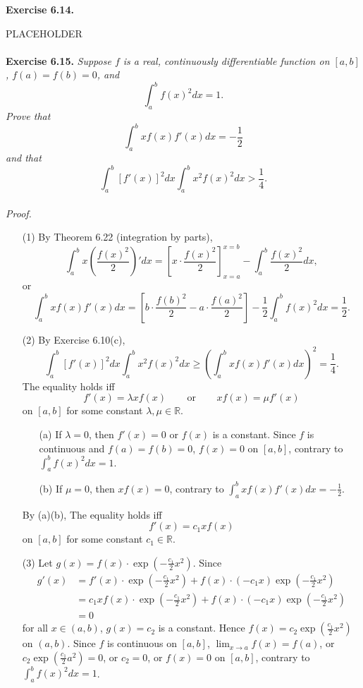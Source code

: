 \documentclass{article}
\begin{document}
\textbf{Exercise 6.14.}

PLACEHOLDER \\\\






\textbf{Exercise 6.15.}
\emph{Suppose $f$ is a real, continuously differentiable function on $[a,b]$,
$f(a)=f(b)=0$, and
\[
  \int_{a}^{b} f(x)^2 dx = 1.
\]
Prove that
\[
  \int_{a}^{b} xf(x)f'(x) dx = -\frac{1}{2}
\]
and that
\[
  \int_{a}^{b} [f'(x)]^2 dx \int_{a}^{b} x^2f(x)^2 dx > \frac{1}{4}.
\]
} \\

\emph{Proof.}
\begin{enumerate}
  \item[(1)]
  By Theorem 6.22 (integration by parts),
  \[
    \int_{a}^{b} x \left( \frac{f(x)^2}{2} \right)' dx
    =
    \left[ x \cdot \frac{f(x)^2}{2} \right]_{x=a}^{x=b}
      - \int_{a}^{b} \frac{f(x)^2}{2} dx,
  \]
  or
  \[
    \int_{a}^{b} xf(x)f'(x) dx
    =
      \left[b \cdot \frac{f(b)^2}{2} - a \cdot \frac{f(a)^2}{2} \right]
      - \frac{1}{2} \int_{a}^{b} f(x)^2 dx
    = \frac{1}{2}.
  \]

  \item[(2)]
  By Exercise 6.10(c),
  \[
    \int_{a}^{b} [f'(x)]^2 dx \int_{a}^{b} x^2f(x)^2 dx
    \geq \left( \int_{a}^{b} xf(x)f'(x) dx \right)^2 = \frac{1}{4}.
  \]
  The equality holds iff
  \[
    f'(x) = \lambda x f(x)
  \:\:\:\:\:\:\:\:
  \text{ or }
  \:\:\:\:\:\:\:\:
  x f(x) = \mu f'(x)
  \]
  on $[a,b]$ for some constant $\lambda, \mu \in \mathbb{R}$.
  \begin{enumerate}
  \item[(a)]
    If $\lambda = 0$, then $f'(x) = 0$ or $f(x)$ is a constant.
    Since $f$ is continuous and $f(a) = f(b) = 0$, $f(x) = 0$ on $[a,b]$,
    contrary to $\int_{a}^{b} f(x)^2 dx = 1$.

  \item[(b)]
    If $\mu = 0$, then $x f(x) = 0$, contrary to $\int_{a}^{b} xf(x)f'(x) dx = -\frac{1}{2}$.
  \end{enumerate}
  By (a)(b),
  The equality holds iff
  \[
    f'(x) = c_1 x f(x)
  \]
  on $[a,b]$ for some constant $c_1 \in \mathbb{R}$.

  \item[(3)]
  Let $g(x) = f(x) \cdot \exp(-\frac{c_1}{2}x^2)$.
  Since
  \begin{align*}
    g'(x)
    &= f'(x) \cdot \exp(-\frac{c_1}{2}x^2) + f(x) \cdot (-c_1 x) \exp(-\frac{c_1}{2}x^2) \\
    &= c_1 x f(x) \cdot \exp(-\frac{c_1}{2}x^2) + f(x) \cdot (-c_1 x) \exp(-\frac{c_1}{2}x^2) \\
    &= 0
  \end{align*}
  for all $x \in (a,b)$,
  $g(x) = c_2$ is a constant.
  Hence $f(x) = c_2 \exp(\frac{c_1}{2}x^2)$ on $(a,b)$.
  Since $f$ is continuous on $[a,b]$,
  $\lim_{x \to a} f(x) = f(a)$,
  or $c_2 \exp(\frac{c_1}{2}a^2) = 0$,
  or $c_2 = 0$,
  or $f(x) = 0$ on $[a,b]$,
  contrary to $\int_{a}^{b} f(x)^2 dx = 1$.


\end{enumerate}
\end{document}
